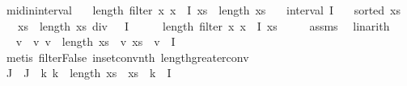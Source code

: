 \begin{isabellebody}
\endisatagproof
{\isafoldproof}%
%
\isadelimproof
\isanewline
%
\endisadelimproof
\isanewline
{}\isamarkupfalse%
\ mid{\isacharunderscore}{\kern0pt}in{\isacharunderscore}{\kern0pt}interval{\isacharcolon}{\kern0pt}\isanewline
\ \ \ {\isachardoublequoteopen}{}{\isacharasterisk}{\kern0pt}length\ {\isacharparenleft}{\kern0pt}filter\ {\isacharparenleft}{\kern0pt}{\isasymlambda}x{\isachardot}{\kern0pt}\ x\ {\isasymin}\ I{\isacharparenright}{\kern0pt}\ xs{\isacharparenright}{\kern0pt}\ {\isachargreater}{\kern0pt}\ length\ xs{\isachardoublequoteclose}\isanewline
\ \ \ {\isachardoublequoteopen}interval\ I{\isachardoublequoteclose}\isanewline
\ \ \ {\isachardoublequoteopen}sorted\ xs{\isachardoublequoteclose}\isanewline
\ \ \ {\isachardoublequoteopen}xs\ {\isacharbang}{\kern0pt}\ {\isacharparenleft}{\kern0pt}length\ xs\ div\ {}{\isacharparenright}{\kern0pt}\ {\isasymin}\ I{\isachardoublequoteclose}\isanewline
%
\isadelimproof
%
\endisadelimproof
%
\isatagproof
{}\isamarkupfalse%
\ {\isacharminus}{\kern0pt}\isanewline
\ \ \isamarkupfalse%
\ {\isachardoublequoteopen}length\ {\isacharparenleft}{\kern0pt}filter\ {\isacharparenleft}{\kern0pt}{\isasymlambda}x{\isachardot}{\kern0pt}\ x\ {\isasymin}\ I{\isacharparenright}{\kern0pt}\ xs{\isacharparenright}{\kern0pt}\ {\isachargreater}{\kern0pt}\ {}{\isachardoublequoteclose}\ \ \isamarkupfalse%
\ assms{\isacharparenleft}{\kern0pt}{}{\isacharparenright}{\kern0pt}\ \isamarkupfalse%
\ linarith\isanewline
\ \ \isamarkupfalse%
\ \isamarkupfalse%
\ v\ \ v{\isacharunderscore}{\kern0pt}{}{\isacharcolon}{\kern0pt}\ {\isachardoublequoteopen}v\ {\isacharless}{\kern0pt}\ length\ xs{\isachardoublequoteclose}\ \ v{\isacharunderscore}{\kern0pt}{}{\isacharcolon}{\kern0pt}\ {\isachardoublequoteopen}xs\ {\isacharbang}{\kern0pt}\ v\ {\isasymin}\ I{\isachardoublequoteclose}\ \isanewline
\ \ \ \ \isamarkupfalse%
\ {\isacharparenleft}{\kern0pt}metis\ filter{\isacharunderscore}{\kern0pt}False\ in{\isacharunderscore}{\kern0pt}set{\isacharunderscore}{\kern0pt}conv{\isacharunderscore}{\kern0pt}nth\ length{\isacharunderscore}{\kern0pt}greater{\isacharunderscore}{\kern0pt}{}{\isacharunderscore}{\kern0pt}conv{\isacharparenright}{\kern0pt}\isanewline
\isanewline
\ \ \isamarkupfalse%
\ J\ \ {\isachardoublequoteopen}J\ {\isacharequal}{\kern0pt}\ {\isacharbraceleft}{\kern0pt}k{\isachardot}{\kern0pt}\ k\ {\isacharless}{\kern0pt}\ length\ xs\ {\isasymand}\ xs\ {\isacharbang}{\kern0pt}\ k\ {\isasymin}\ I{\isacharbraceright}{\kern0pt}{\isachardoublequoteclose}\isanewline

\end{isabellebody}
